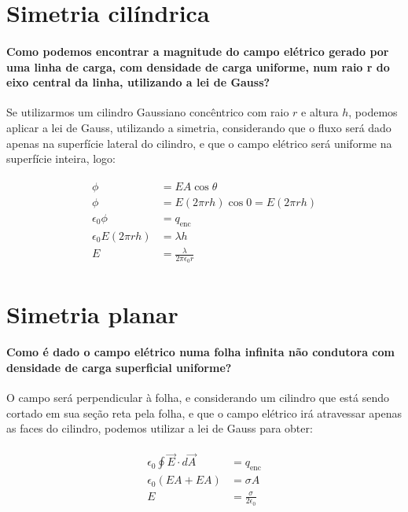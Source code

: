 \section*{Simetria cilíndrica}

  \paragraph{Como podemos encontrar a magnitude do campo elétrico gerado por uma linha de carga, com densidade de carga uniforme, num raio r do eixo central da linha, utilizando a lei de Gauss?} Se utilizarmos um cilindro Gaussiano concêntrico com raio $r$ e altura $h$, podemos aplicar a lei de Gauss, utilizando a simetria, considerando que o fluxo será dado apenas na superfície lateral do cilindro, e que o campo elétrico será uniforme na superfície inteira, logo:

  \begin{gather}
    \begin{align}
      \phi &= EA \cos{\theta} \\
      \phi &= E (2 \pi r h) \cos{0} = E (2 \pi r h) \\
      \epsilon_0 \phi &= q_{\text{enc}} \\
      \epsilon_0 E (2 \pi r h ) &= \lambda h \\
      E &= \frac{\lambda}{2 \pi \epsilon_0 r}
    \end{align}
  \end{gather}

\section*{Simetria planar}

  \paragraph{Como é dado o campo elétrico numa folha infinita não condutora com densidade de carga superficial uniforme?} O campo será perpendicular à folha, e considerando um cilindro que está sendo cortado em sua seção reta pela folha, e que o campo elétrico irá atravessar apenas as faces do cilindro, podemos utilizar a lei de Gauss para obter:

  \begin{gather}
    \begin{align}
      \epsilon_0 \oint \vec{E} \cdot d \vec{A} &= q_{\text{enc}} \\
      \epsilon_0 (EA + EA) &= \sigma A \\
      E &= \frac{\sigma}{2 \epsilon_0}
    \end{align}
  \end{gather}

